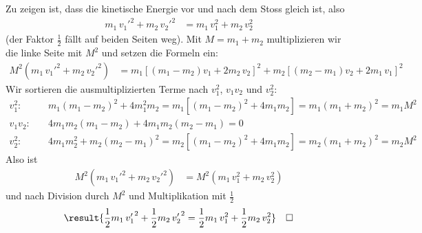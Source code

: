 Zu zeigen ist, dass die kinetische Energie vor und nach dem Stoss gleich ist, also
\begin{align}
 m_1\,{v_1'}^2 + m_2\,{v_2'}^2 &= m_1\,v_1^2 + m_2\,v_2^2
\end{align}
(der Faktor $\frac{1}{2}$ fällt auf beiden Seiten weg). Mit $M = m_1+m_2$ multiplizieren wir die linke Seite mit $M^2$ und setzen die Formeln ein:
\begin{align}
 M^2\left(m_1\,{v_1'}^2 + m_2\,{v_2'}^2\right) &= m_1\left[\left(m_1-m_2\right)v_1+2m_2\,v_2\right]^2 + m_2\left[\left(m_2-m_1\right)v_2+2m_1\,v_1\right]^2
\end{align}
Wir sortieren die ausmultiplizierten Terme nach $v_1^2$, $v_1 v_2$ und $v_2^2$:
\begin{align}
 v_1^2:&\quad m_1\left(m_1-m_2\right)^2 + 4m_1^2 m_2 = m_1\left[\left(m_1-m_2\right)^2+4m_1 m_2\right] = m_1\left(m_1+m_2\right)^2 = m_1 M^2 \\
 v_1 v_2:&\quad 4m_1 m_2\left(m_1-m_2\right) + 4m_1 m_2\left(m_2-m_1\right) = 0 \\
 v_2^2:&\quad 4m_1 m_2^2 + m_2\left(m_2-m_1\right)^2 = m_2\left[\left(m_1-m_2\right)^2+4m_1 m_2\right] = m_2\left(m_1+m_2\right)^2 = m_2 M^2
\end{align}
Also ist
\begin{align}
 M^2\left(m_1\,{v_1'}^2 + m_2\,{v_2'}^2\right) &= M^2\left(m_1\,v_1^2 + m_2\,v_2^2\right)
\end{align}
und nach Division durch $M^2$ und Multiplikation mit $\frac{1}{2}$
\begin{align}
 \result{\frac{1}{2}m_1\,{v_1'}^2 + \frac{1}{2}m_2\,{v_2'}^2 = \frac{1}{2}m_1\,v_1^2 + \frac{1}{2}m_2\,v_2^2} \quad\square
\end{align}
